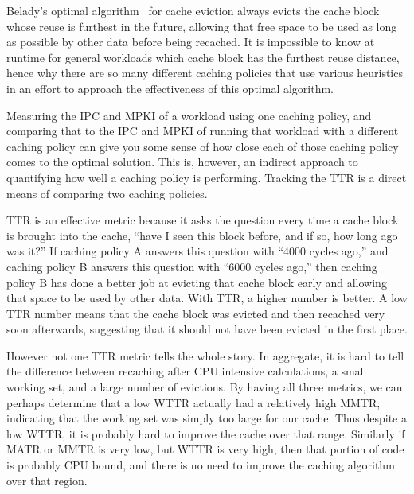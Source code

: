 Belady's optimal algorithm~\cite{belady66} for cache eviction always evicts the cache block whose reuse is furthest in the future,
 allowing that free space to be used as long as possible by other data before being recached.
It is impossible to know at runtime for general workloads which cache block has the furthest reuse distance,
 hence why there are so many different caching policies that use various heuristics in an effort to approach the effectiveness of this optimal algorithm.

Measuring the IPC and MPKI of a workload using one caching policy,
 and comparing that to the IPC and MPKI of running that workload with a different caching policy can give you some sense of how close each of those caching policy comes to the optimal solution.
This is, however, an indirect approach to quantifying how well a caching policy is performing.
Tracking the TTR is a direct means of comparing two caching policies.

TTR is an effective metric because it asks the question every time a cache block is brought into the cache,
 ``have I seen this block before, and if so, how long ago was it?''
If caching policy A answers this question with ``4000 cycles ago,''
 and caching policy B answers this question with ``6000 cycles ago,''
 then caching policy B has done a better job at evicting that cache block early and allowing that space to be used by other data.
With TTR, a higher number is better.
A low TTR number means that the cache block was evicted and then recached very soon afterwards,
 suggesting that it should not have been evicted in the first place.

However not one TTR metric tells the whole story.
In aggregate, it is hard to tell the difference between recaching after CPU intensive calculations, a small working set, and a large number of evictions.
By having all three metrics, we can perhaps determine that a low WTTR actually had a relatively high MMTR, indicating that the working set was simply too large for our cache.
Thus despite a low WTTR, it is probably hard to improve the cache over that range.
Similarly if MATR or MMTR is very low, but WTTR is very high, then that portion of code is probably CPU bound, and there is no need to improve the caching algorithm over that region.

